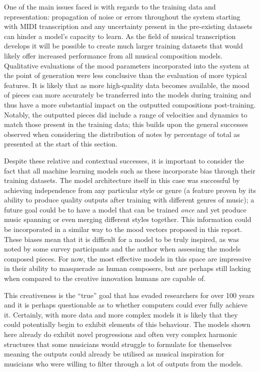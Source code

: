 \documentclass[12pt,]{article}
\begin{document}
One of the main issues faced is with regards to the training data and
representation: propagation of noise or errors throughout the system
starting with MIDI transcription and any uncertainty present in the
pre-existing datasets can hinder a model's capacity to learn. As the
field of musical transcription develops it will be possible to create
much larger training datasets that would likely offer increased
performance from all musical composition models. Qualitative evaluations
of the mood parameters incorporated into the system at the point of
generation were less conclusive than the evaluation of more typical
features. It is likely that as more high-quality data becomes available,
the mood of pieces can more accurately be transferred into the models
during training and thus have a more substantial impact on the outputted
compositions post-training. Notably, the outputted pieces did include a
range of velocities and dynamics to match those present in the training
data; this builds upon the general successes observed when considering
the distribution of notes by percentage of total as presented at the
start of this section.

Despite these relative and contextual successes, it is important to
consider the fact that all machine learning models such as these
incorporate bias through their training datasets. The model architecture
itself in this case was successful by achieving independence from any
particular style or genre (a feature proven by its ability to produce
quality outputs after training with different genres of music); a future
goal could be to have a model that can be trained \emph{once} and yet
produce music spanning or even merging different styles together. This
information could be incorporated in a similar way to the mood vectors
proposed in this report. These biases mean that it is difficult for a
model to be truly inspired, as was noted by some survey participants and
the author when assessing the models composed pieces. For now, the most
effective models in this space are impressive in their ability to
masquerade as human composers, but are perhaps still lacking when
compared to the creative innovation humans are capable of.

This creativeness is the ``true'' goal that has evaded researchers for
over 100 years and it is perhaps questionable as to whether computers
could ever fully achieve it. Certainly, with more data and more complex
models it is likely that they could potentially begin to exhibit
elements of this behaviour. The models shown here already do exhibit
novel progressions and often very complex harmonic structures that some
musicians would struggle to formulate for themselves meaning the outputs
could already be utilised as musical inspiration for musicians who were
willing to filter through a lot of outputs from the models.
\end{document}
